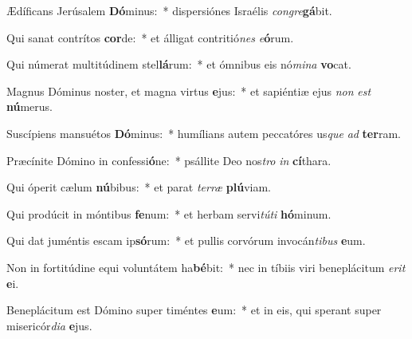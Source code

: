\item Ædíficans Jerúsalem \textbf{Dó}minus:~* dispersiónes Israélis \textit{con}\textit{gre}\textbf{gá}bit.
\item Qui sanat contrítos \textbf{cor}de:~* et álligat contritió\textit{nes} \textit{e}\textbf{ó}rum.
\item Qui númerat multitúdinem stel\textbf{lá}rum:~* et ómnibus eis nó\textit{mi}\textit{na} \textbf{vo}cat.
\item Magnus Dóminus noster, et magna virtus \textbf{e}jus:~* et sapiéntiæ ejus \textit{non} \textit{est} \textbf{nú}merus.
\item Suscípiens mansuétos \textbf{Dó}minus:~* humílians autem peccatóres us\textit{que} \textit{ad} \textbf{ter}ram.
\item Præcínite Dómino in confessi\textbf{ó}ne:~* psállite Deo nos\textit{tro} \textit{in} \textbf{cí}thara.
\item Qui óperit cælum \textbf{nú}bibus:~* et parat \textit{ter}\textit{ræ} \textbf{plú}viam.
\item Qui prodúcit in móntibus \textbf{fe}num:~* et herbam servi\textit{tú}\textit{ti} \textbf{hó}minum.
\item Qui dat juméntis escam ip\textbf{só}rum:~* et pullis corvórum invocán\textit{ti}\textit{bus} \textbf{e}um.
\item Non in fortitúdine equi voluntátem ha\textbf{bé}bit:~* nec in tíbiis viri beneplácitum \textit{e}\textit{rit} \textbf{e}i.
\item Beneplácitum est Dómino super timéntes \textbf{e}um:~* et in eis, qui sperant super misericór\textit{di}\textit{a} \textbf{e}jus.
